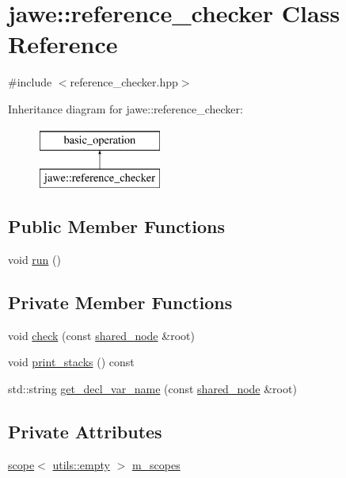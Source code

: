 \hypertarget{classjawe_1_1reference__checker}{}\section{jawe\+:\+:reference\+\_\+checker Class Reference}
\label{classjawe_1_1reference__checker}


{\ttfamily \#include $<$reference\+\_\+checker.\+hpp$>$}

Inheritance diagram for jawe\+:\+:reference\+\_\+checker\+:\begin{figure}[H]
\begin{center}
\leavevmode
\includegraphics[height=2.000000cm]{classjawe_1_1reference__checker}
\end{center}
\end{figure}
\subsection*{Public Member Functions}
\begin{DoxyCompactItemize}
\item 
void \hyperlink{classjawe_1_1reference__checker_a6bb75b8f955c552fc41bc2515e98b502}{run} ()
\end{DoxyCompactItemize}
\subsection*{Private Member Functions}
\begin{DoxyCompactItemize}
\item 
void \hyperlink{classjawe_1_1reference__checker_aa0695229375243aa0fa779cd76de0d8c}{check} (const \hyperlink{namespacejawe_a3f307481d921b6cbb50cc8511fc2b544}{shared\+\_\+node} \&root)
\item 
void \hyperlink{classjawe_1_1reference__checker_a134009355cdaccf4cb4bb29203bdc54a}{print\+\_\+stacks} () const
\item 
std\+::string \hyperlink{classjawe_1_1reference__checker_a040c99abc61e85b2c483f863f7a208bd}{get\+\_\+decl\+\_\+var\+\_\+name} (const \hyperlink{namespacejawe_a3f307481d921b6cbb50cc8511fc2b544}{shared\+\_\+node} \&root)
\end{DoxyCompactItemize}
\subsection*{Private Attributes}
\begin{DoxyCompactItemize}
\item 
\hyperlink{classjawe_1_1utils_1_1scope}{scope}$<$ \hyperlink{classjawe_1_1utils_1_1empty}{utils\+::empty} $>$ \hyperlink{classjawe_1_1reference__checker_ab5f261a23048b85922486b7f7a2960a8}{m\+\_\+scopes}
\end{DoxyCompactItemize}


